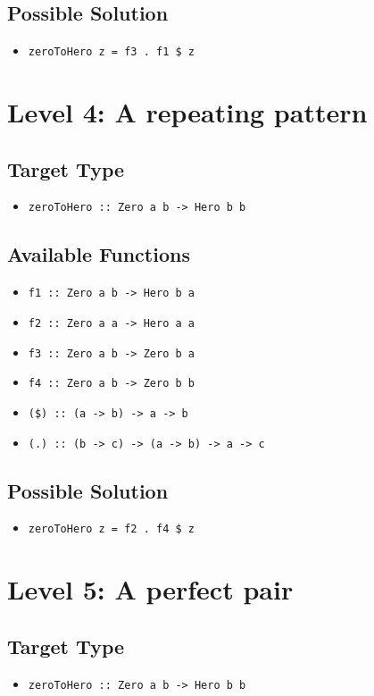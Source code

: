 \subsection{Possible Solution} 
\begin{itemize}
    \item \texttt{zeroToHero z = f3 . f1 \$ z}
\end{itemize}


\section{Level 4: A repeating pattern}
\subsection{Target Type } 
\begin{itemize}
    \item \texttt{zeroToHero :: Zero a b -> Hero b b}
\end{itemize}

\subsection{Available Functions} 
\begin{itemize}
    \item \texttt{f1 :: Zero a b -> Hero b a}
    \item \texttt{f2 :: Zero a a -> Hero a a}
    \item \texttt{f3 :: Zero a b -> Zero b a}
    \item \texttt{f4 :: Zero a b -> Zero b b}
    \item \texttt{(\$) :: (a -> b) -> a -> b}
    \item \texttt{(.) :: (b -> c) -> (a -> b) -> a -> c}
\end{itemize}

\subsection{Possible Solution} 
\begin{itemize}
    \item \texttt{zeroToHero z = f2 . f4 \$ z}
\end{itemize}


\section{Level 5: A perfect pair}
\subsection{Target Type } 
\begin{itemize}
    \item \texttt{zeroToHero :: Zero a b -> Hero b b}
\end{itemize}

